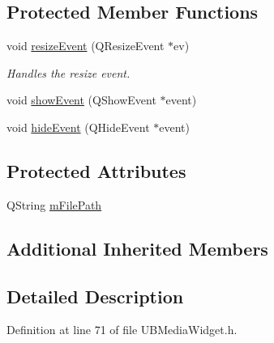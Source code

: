 \subsection*{Protected Member Functions}
\begin{DoxyCompactItemize}
\item 
void \hyperlink{class_u_b_media_widget_ac8d235e70578fcd529aa8c754a68dac5}{resize\-Event} (Q\-Resize\-Event $\ast$ev)
\begin{DoxyCompactList}\small\item\em Handles the resize event. \end{DoxyCompactList}\item 
void \hyperlink{class_u_b_media_widget_aa8d6e2832d273e7d761af4d2b1bbccfa}{show\-Event} (Q\-Show\-Event $\ast$event)
\item 
void \hyperlink{class_u_b_media_widget_ade79f4e9022a5758b44a42ded20898d0}{hide\-Event} (Q\-Hide\-Event $\ast$event)
\end{DoxyCompactItemize}
\subsection*{Protected Attributes}
\begin{DoxyCompactItemize}
\item 
Q\-String \hyperlink{class_u_b_media_widget_a825363acb624843a461aa2581da66626}{m\-File\-Path}
\end{DoxyCompactItemize}
\subsection*{Additional Inherited Members}


\subsection{Detailed Description}


Definition at line 71 of file U\-B\-Media\-Widget.\-h.




